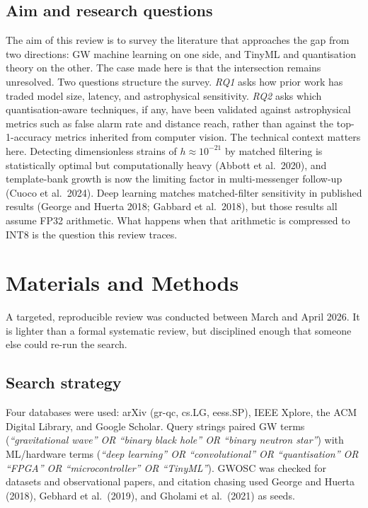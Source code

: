 \documentclass[11pt,a4paper]{article}
\begin{document}
\subsection{Aim and research questions}
The aim of this review is to survey the literature that approaches the gap from two directions: GW machine learning on one side, and TinyML and quantisation theory on the other. The case made here is that the intersection remains unresolved. Two questions structure the survey. \textit{RQ1} asks how prior work has traded model size, latency, and astrophysical sensitivity. \textit{RQ2} asks which quantisation-aware techniques, if any, have been validated against astrophysical metrics such as false alarm rate and distance reach, rather than against the top-1-accuracy metrics inherited from computer vision. The technical context matters here. Detecting dimensionless strains of $h \approx 10^{-21}$ by matched filtering is statistically optimal but computationally heavy (Abbott et al.\ 2020), and template-bank growth is now the limiting factor in multi-messenger follow-up (Cuoco et al.\ 2024). Deep learning matches matched-filter sensitivity in published results (George and Huerta 2018; Gabbard et al.\ 2018), but those results all assume FP32 arithmetic. What happens when that arithmetic is compressed to INT8 is the question this review traces.

\section{Materials and Methods}

A targeted, reproducible review was conducted between March and April 2026. It is lighter than a formal systematic review, but disciplined enough that someone else could re-run the search.

\subsection{Search strategy}
Four databases were used: arXiv (gr-qc, cs.LG, eess.SP), IEEE Xplore, the ACM Digital Library, and Google Scholar. Query strings paired GW terms (\textit{``gravitational wave'' OR ``binary black hole'' OR ``binary neutron star''}) with ML/hardware terms (\textit{``deep learning'' OR ``convolutional'' OR ``quantisation'' OR ``FPGA'' OR ``microcontroller'' OR ``TinyML''}). GWOSC was checked for datasets and observational papers, and citation chasing used George and Huerta (2018), Gebhard et al.\ (2019), and Gholami et al.\ (2021) as seeds.
\end{document}
